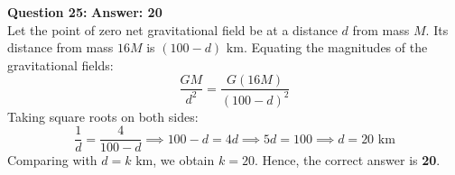 \documentclass[11pt,a4paper]{article}
\begin{document}
\begin{tcolorbox}[solbox]
  \textbf{\textcolor{primaryDark}{Question 25:}} \hfill \textbf{\textcolor{l1Green}{Answer: 20}}\\
  \vspace{3pt}
  Let the point of zero net gravitational field be at a distance $d$ from mass $M$. Its distance from mass $16M$ is $(100 - d)\text{ km}$.
\vspace{3pt}
Equating the magnitudes of the gravitational fields:
$$\frac{GM}{d^2} = \frac{G(16M)}{(100 - d)^2}$$
\vspace{3pt}
Taking square roots on both sides:
$$\frac{1}{d} = \frac{4}{100 - d} \implies 100 - d = 4d \implies 5d = 100 \implies d = 20\text{ km}$$
\vspace{3pt}
Comparing with $d = k\text{ km}$, we obtain $k = 20$.
\vspace{3pt}
Hence, the correct answer is \textbf{20}.
\end{tcolorbox}
\vspace{3pt}
\end{document}

